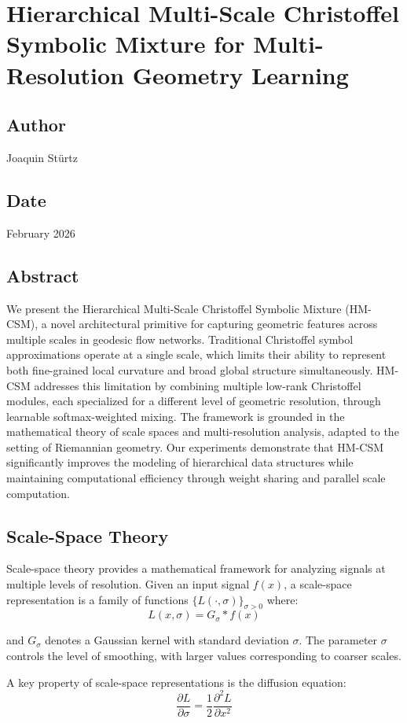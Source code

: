 \section{Hierarchical Multi-Scale Christoffel Symbolic Mixture for Multi-Resolution Geometry Learning}
\subsection*{Author}
Joaquin Stürtz
\subsection*{Date}
February 2026
\subsection*{Abstract}
We present the Hierarchical Multi-Scale Christoffel Symbolic Mixture (HM-CSM), a novel architectural primitive for capturing geometric features across multiple scales in geodesic flow networks. Traditional Christoffel symbol approximations operate at a single scale, which limits their ability to represent both fine-grained local curvature and broad global structure simultaneously. HM-CSM addresses this limitation by combining multiple low-rank Christoffel modules, each specialized for a different level of geometric resolution, through learnable softmax-weighted mixing. The framework is grounded in the mathematical theory of scale spaces and multi-resolution analysis, adapted to the setting of Riemannian geometry. Our experiments demonstrate that HM-CSM significantly improves the modeling of hierarchical data structures while maintaining computational efficiency through weight sharing and parallel scale computation.

\subsection{Scale-Space Theory}
Scale-space theory provides a mathematical framework for analyzing signals at multiple levels of resolution. Given an input signal $f(x)$, a scale-space representation is a family of functions $\{L(\cdot, \sigma)\}_{\sigma > 0}$ where:
$$L(x, \sigma) = G_\sigma * f(x)$$

and $G_\sigma$ denotes a Gaussian kernel with standard deviation $\sigma$. The parameter $\sigma$ controls the level of smoothing, with larger values corresponding to coarser scales.

A key property of scale-space representations is the diffusion equation:
$$\frac{\partial L}{\partial \sigma} = \frac{1}{2} \frac{\partial^2 L}{\partial x^2}$$

